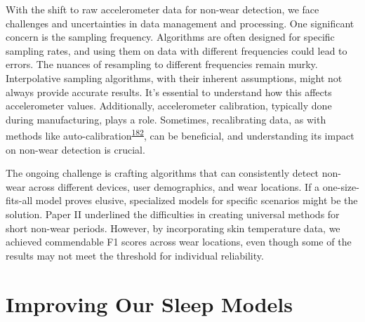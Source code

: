 \documentclass[
  10pt,
]{scrbook}
\begin{document}
With the shift to raw accelerometer data for non-wear detection, we face
challenges and uncertainties in data management and processing. One
significant concern is the sampling frequency. Algorithms are often
designed for specific sampling rates, and using them on data with
different frequencies could lead to errors. The nuances of resampling to
different frequencies remain murky. Interpolative sampling algorithms,
with their inherent assumptions, might not always provide accurate
results. It's essential to understand how this affects accelerometer
values. Additionally, accelerometer calibration, typically done during
manufacturing, plays a role. Sometimes, recalibrating data, as with
methods like
auto-calibration\textsuperscript{\protect\hyperlink{ref-hees_2014}{182}},
can be beneficial, and understanding its impact on non-wear detection is
crucial.

The ongoing challenge is crafting algorithms that can consistently
detect non-wear across different devices, user demographics, and wear
locations. If a one-size-fits-all model proves elusive, specialized
models for specific scenarios might be the solution. Paper II underlined
the difficulties in creating universal methods for short non-wear
periods. However, by incorporating skin temperature data, we achieved
commendable F1 scores across wear locations, even though some of the
results may not meet the threshold for individual reliability.

\hypertarget{improving-our-sleep-models}{%
\section{Improving Our Sleep Models}\label{improving-our-sleep-models}}
\end{document}
